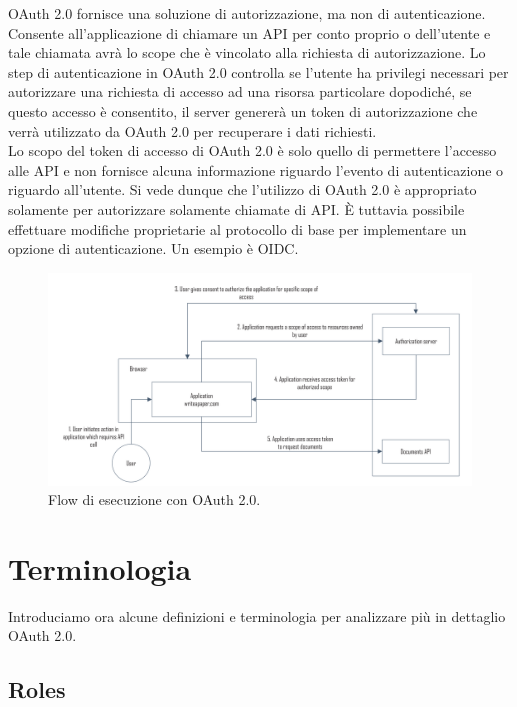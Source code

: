 OAuth 2.0 fornisce una soluzione di autorizzazione, ma non di autenticazione. Consente
all'applicazione di chiamare un API per conto proprio o dell'utente e tale chiamata
avrà lo scope che è vincolato alla richiesta di autorizzazione. Lo step di
autenticazione in OAuth 2.0 controlla se l'utente ha privilegi necessari per
autorizzare una richiesta di accesso ad una risorsa particolare dopodiché, se
questo accesso è consentito, il server genererà un token di autorizzazione che
verrà utilizzato da OAuth 2.0 per recuperare i dati richiesti.\\
Lo scopo del token di accesso di OAuth 2.0 è solo quello di permettere l'accesso alle
API e non fornisce alcuna informazione riguardo l'evento di autenticazione o riguardo
all'utente.
Si vede dunque che l'utilizzo di OAuth 2.0 è appropriato solamente per autorizzare
solamente chiamate di API. È tuttavia possibile effettuare modifiche proprietarie al
protocollo di base per implementare un opzione di autenticazione. Un esempio è
OIDC.

\begin{figure}[H]
      \centering
      \includegraphics[width=\textwidth, keepaspectratio]{capitoli/id_managing/imgs/api2.png}
      \caption{Flow di esecuzione con OAuth 2.0.}
\end{figure}

\section{Terminologia}

Introduciamo ora alcune definizioni e terminologia per analizzare più in dettaglio
OAuth 2.0.

\subsection{Roles}

